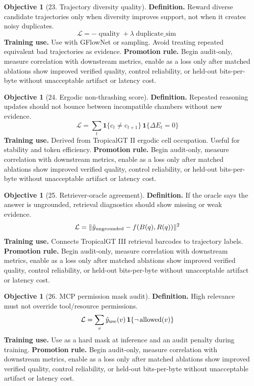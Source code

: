 \documentclass[11pt]{article}
\theoremstyle{definition}
\newtheorem{objective}[theorem]{Objective}
\theoremstyle{remark}
\newcommand{\loss}{\mathcal{L}}
\numberwithin{equation}{section}
\begin{document}
\begin{objective}[23. Trajectory diversity quality]
\textbf{Definition.} Reward diverse candidate trajectories only when diversity improves support, not when it creates noisy duplicates.
\begin{equation}
    \loss=-\operatorname{quality}+\lambda\operatorname{duplicate\_sim}
\end{equation}
\textbf{Training use.} Use with GFlowNet or sampling. Avoid treating repeated equivalent bad trajectories as evidence.
\textbf{Promotion rule.} Begin audit-only, measure correlation with downstream metrics, enable as a loss only after matched ablations show improved verified quality, control reliability, or held-out bits-per-byte without unacceptable artifact or latency cost.
\end{objective}


\begin{objective}[24. Ergodic non-thrashing score]
\textbf{Definition.} Repeated reasoning updates should not bounce between incompatible chambers without new evidence.
\begin{equation}
    \loss=\sum_t \mathbf 1\{c_t\ne c_{t+1}\}\,\mathbf 1\{\Delta E_t=0\}
\end{equation}
\textbf{Training use.} Derived from TropicalGT II ergodic cell occupation. Useful for stability and token efficiency.
\textbf{Promotion rule.} Begin audit-only, measure correlation with downstream metrics, enable as a loss only after matched ablations show improved verified quality, control reliability, or held-out bits-per-byte without unacceptable artifact or latency cost.
\end{objective}


\begin{objective}[25. Retriever-oracle agreement]
\textbf{Definition.} If the oracle says the answer is ungrounded, retrieval diagnostics should show missing or weak evidence.
\begin{equation}
    \loss=\|\hat y_{\rm ungrounded}-f(B(q),R(q))\|^2
\end{equation}
\textbf{Training use.} Connects TropicalGT III retrieval barcodes to trajectory labels.
\textbf{Promotion rule.} Begin audit-only, measure correlation with downstream metrics, enable as a loss only after matched ablations show improved verified quality, control reliability, or held-out bits-per-byte without unacceptable artifact or latency cost.
\end{objective}


\begin{objective}[26. MCP permission mask audit]
\textbf{Definition.} High relevance must not override tool/resource permissions.
\begin{equation}
    \loss=\sum_{v}\hat y_{\rm use}(v)\,\mathbf 1\{\neg\operatorname{allowed}(v)\}
\end{equation}
\textbf{Training use.} Use as a hard mask at inference and an audit penalty during training.
\textbf{Promotion rule.} Begin audit-only, measure correlation with downstream metrics, enable as a loss only after matched ablations show improved verified quality, control reliability, or held-out bits-per-byte without unacceptable artifact or latency cost.
\end{objective}
\end{document}
